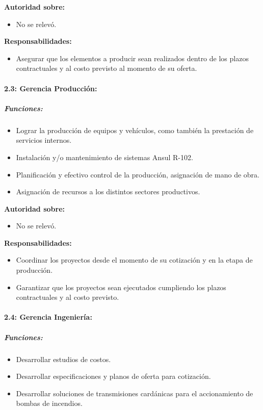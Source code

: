\documentclass[a4paper,10pt]{article}
\begin{document}
		\textbf{Autoridad sobre:} 
		\begin{itemize}
		\item No se relevó.
		\end{itemize}

		\textbf{Responsabilidades:}
		\begin{itemize}
			\item Asegurar que los elementos a producir sean realizados dentro de los plazos contractuales y al costo previsto al momento de su oferta.
		\end{itemize}

		\paragraph{2.3: Gerencia Producción:}

			\subparagraph{Funciones:}
			\begin{itemize}
 			\item Lograr la producción de equipos y vehículos, como también la prestación de servicios internos.
 			\item Instalación y/o mantenimiento de sistemas Ansul R-102.
 			\item Planificación y efectivo control de la producción, asignación de mano de obra.
	 		\item Asignación de recursos a los distintos sectores productivos.
	 		\end{itemize}
			

		\textbf{Autoridad sobre:} 
		\begin{itemize}
		\item No se relevó.
		\end{itemize}

			\textbf{Responsabilidades:}
			\begin{itemize}
				\item Coordinar los proyectos desde el momento de su cotización y en la etapa de producción.
				\item Garantizar que los proyectos sean ejecutados cumpliendo los plazos contractuales y al costo
previsto.
			\end{itemize}

			\paragraph{2.4: Gerencia Ingeniería:}
			\subparagraph{Funciones:}
			\begin{itemize}
	 			\item Desarrollar estudios de costos.
	 			\item Desarrollar especificaciones y planos de oferta para cotización. 
	 			\item Desarrollar soluciones de transmisiones cardánicas para el accionamiento de bombas de incendios.
	 		\end{itemize}
			
\end{document}
